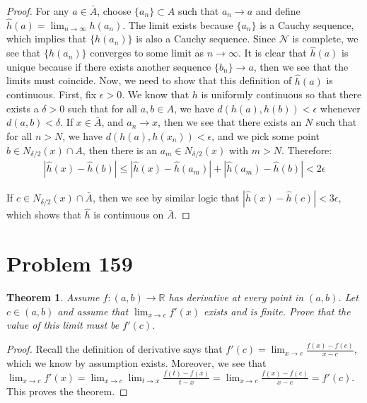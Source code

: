 \documentclass[psamsfonts]{amsart}
\newtheorem{thm}{Theorem}[section]
\theoremstyle{definition}
\theoremstyle{remark}
\numberwithin{equation}{section}
\begin{document}
\begin{proof}
For any $a \in \bar{A}$, choose $\{ a_n \} \subset A$ such that $a_n \to a$ and define $\hat{h}(a) = \lim_{n \to \infty} h( a_n )$. The limit exists because $\{ a_n \}$ is a Cauchy sequence, which implies that $\{ h(a_n) \}$ is also a Cauchy sequence. Since $\mathscr{N}$ is complete, we see that $\{ h(a_n) \}$ converges to some limit as $n \to \infty$. It is clear that $\hat{h}(a)$ is unique because if there exists another sequence $\{ b_n \} \to a$, then we see that the limits must coincide. Now, we need to show that this definition of $\hat{h}(a)$ is continuous. First, fix $\epsilon > 0$. We know that $h$ is uniformly continuous so that there exists a $\delta > 0$ such that for all $a,b \in A$, we have $d(h(a),h(b)) < \epsilon$ whenever $d(a,b) < \delta$. If $x \in \bar{A}$, and $a_n \to x$, then we see that there exists an $N$ such that for all $n > N$, we have $d(h(a),h(x_n)) < \epsilon$, and we pick some point $b \in N_{\delta/2}(x) \cap A$, then there is an $a_m \in N_{\delta/2}(x)$ with $m > N$. Therefore:
\begin{eqnarray}
|\hat{h}(x) - \hat{h}(b) | \leq |\hat{h}(x) - \hat{h}(a_m)| + |\hat{h}(a_m) - \hat{h}(b)| < 2 \epsilon
\end{eqnarray}

If $c \in N_{\delta/2} (x) \cap \bar{A}$, then we see by similar logic that $|\hat{h}(x) - \hat{h}(c) | < 3 \epsilon$, which shows that $\hat{h}$ is continuous on $\bar{A}$. 
\end{proof}

\section{Problem 159}

\begin{thm}
Assume $f: (a,b) \to \mathbb{R}$ has derivative at every point in $(a,b)$. Let $c \in (a,b)$ and assume that $\lim_{x \to c} f'(x)$ exists and is finite. Prove that the value of this limit must be $f'(c)$. 
\end{thm}

\begin{proof}
Recall the definition of derivative says that $f'(c) = \lim_{x \to c} \frac{f(x) - f(c)}{x - c}$, which we know by assumption exists. Moreover, we see that $\lim_{x \to c} f'(x) = \lim_{x \to c} \lim_{t \to x} \frac{ f(t) - f(x)}{t - x} = \lim_{x \to c} \frac{f(x) - f(c)}{x-c} = f'(c)$. This proves the theorem. 
\end{proof}
\end{document}
